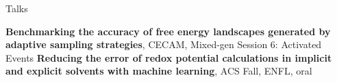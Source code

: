 \begin{rubric}{Talks}


\entry*[\hspace{1.05cm}2021] \textbf{Benchmarking the accuracy of free energy landscapes generated by adaptive sampling strategies}, CECAM, Mixed-gen Session 6: Activated Events
\entry*[\hspace{1.05cm}2021] \textbf{Reducing the error of redox potential calculations in implicit and explicit solvents with machine learning}, ACS Fall, ENFL, oral
\end{rubric}


